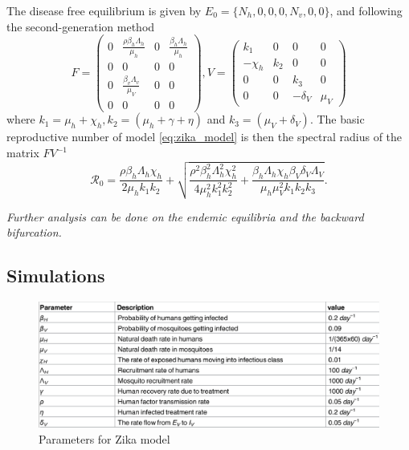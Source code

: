 \documentclass{book}
\begin{document}
The disease free equilibrium is given by $E_0=\{N_h,0,0,0,N_v,0,0\}$, and following the second-generation method
$$
F=\left(\begin{array}{cccc}
0 & \frac{\rho \beta_{h} \Lambda_{h}}{\mu_{h}} & 0 & \frac{\beta_{h} \Lambda_{h}}{\mu_{h}} \\
0 & 0 & 0 & 0 \\
0 & \frac{\beta_{v} \Lambda_{v}}{\mu_{V}} & 0 & 0 \\
0 & 0 & 0 & 0
\end{array}\right), V=\left(\begin{array}{cccc}
k_{1} & 0 & 0 & 0 \\
-\chi_{h} & k_{2} & 0 & 0 \\
0 & 0 & k_{3} & 0 \\
0 & 0 & -\delta_{V} & \mu_{V}
\end{array}\right)
$$
where $k_{1}=\mu_{h}+\chi_{h}, k_{2}=\left(\mu_{h}+\gamma+\eta\right)$ and $k_{3}=\left(\mu_{V}+\delta_{V}\right)$. The basic reproductive number of model \eqref{eq:zika_model} is  then the spectral radius of the matrix $FV^{-1}$
$$\mathcal{R}_{0}=\frac{\rho \beta_{h} \Lambda_{h} \chi_{h}}{2 \mu_{h} k_{1} k_{2}}+\sqrt{\frac{\rho^{2} \beta_{h}^{2} \Lambda_{h}^{2} \chi_{h}^{2}}{4 \mu_{h}^{2} k_{1}^{2} k_{2}^{2}}+\frac{\beta_{h} \Lambda_{h} \chi_{h} \beta_{V} \delta_{V} \Lambda_{V}}{\mu_{h} \mu_{V}^{2} k_{1} k_{2} k_{3}}}.$$

{\it Further analysis can be done on the endemic equilibria and the backward bifurcation.}

\subsection*{Simulations}

\begin{figure}[H]
    \centering
    \includegraphics[scale=0.25]{zika1}
    \caption{Parameters for Zika model}
    \label{fig:zika_params}
\end{figure}
\end{document}
